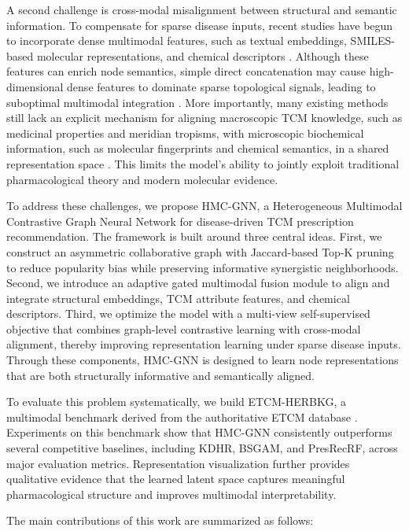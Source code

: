 \documentclass[a4paper,fleqn]{cas-dc}
\begin{document}
A second challenge is cross-modal misalignment between structural and semantic information. To compensate for sparse disease inputs, recent studies have begun to incorporate dense multimodal features, such as textual embeddings, SMILES-based molecular representations, and chemical descriptors \cite{ref45,ref46}. Although these features can enrich node semantics, simple direct concatenation may cause high-dimensional dense features to dominate sparse topological signals, leading to suboptimal multimodal integration \cite{ref47}. More importantly, many existing methods still lack an explicit mechanism for aligning macroscopic TCM knowledge, such as medicinal properties and meridian tropisms, with microscopic biochemical information, such as molecular fingerprints and chemical semantics, in a shared representation space \cite{ref48,ref49}. This limits the model’s ability to jointly exploit traditional pharmacological theory and modern molecular evidence.

To address these challenges, we propose HMC-GNN, a Heterogeneous Multimodal Contrastive Graph Neural Network for disease-driven TCM prescription recommendation. The framework is built around three central ideas. First, we construct an asymmetric collaborative graph with Jaccard-based Top-K pruning to reduce popularity bias while preserving informative synergistic neighborhoods. Second, we introduce an adaptive gated multimodal fusion module to align and integrate structural embeddings, TCM attribute features, and chemical descriptors. Third, we optimize the model with a multi-view self-supervised objective that combines graph-level contrastive learning with cross-modal alignment, thereby improving representation learning under sparse disease inputs. Through these components, HMC-GNN is designed to learn node representations that are both structurally informative and semantically aligned.

To evaluate this problem systematically, we build ETCM-HERBKG, a multimodal benchmark derived from the authoritative ETCM database \cite{ref50}. Experiments on this benchmark show that HMC-GNN consistently outperforms several competitive baselines, including KDHR, BSGAM, and PresRecRF, across major evaluation metrics. Representation visualization further provides qualitative evidence that the learned latent space captures meaningful pharmacological structure and improves multimodal interpretability.

The main contributions of this work are summarized as follows:
\end{document}
